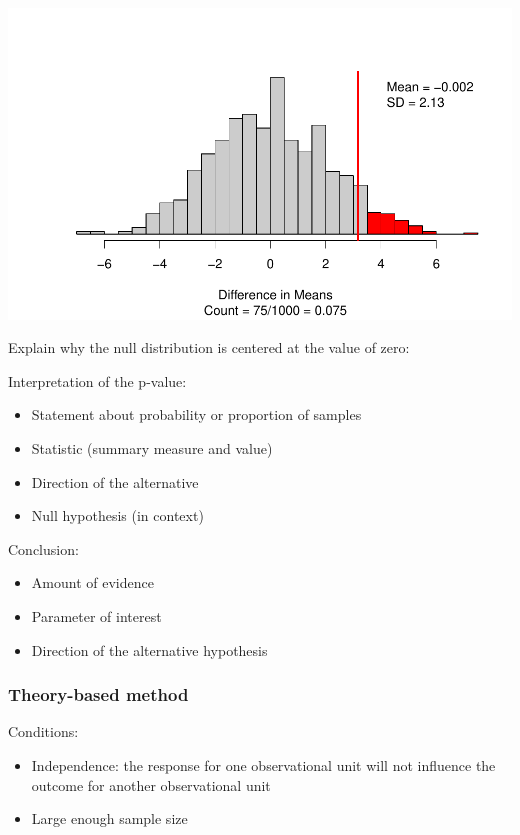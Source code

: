 \documentclass[
]{report}
\begin{document}
\begin{center}\includegraphics[width=0.7\linewidth]{12-LN012-1ofeach_files/figure-latex/unnamed-chunk-3-1} \end{center}

Explain why the null distribution is centered at the value of zero:

\newpage

Interpretation of the p-value:

\begin{itemize}
\item
  Statement about probability or proportion of samples
\item
  Statistic (summary measure and value)
\item
  Direction of the alternative
\item
  Null hypothesis (in context)
\end{itemize}

\vspace{0.8in}

Conclusion:

\begin{itemize}
\item
  Amount of evidence
\item
  Parameter of interest
\item
  Direction of the alternative hypothesis
\end{itemize}

\vspace{0.6in}

\hypertarget{theory-based-method-3}{%
\subsubsection*{Theory-based method}\label{theory-based-method-3}}

Conditions:

\begin{itemize}
\item
  Independence: the response for one observational unit will not influence the outcome for another observational unit
\item
  Large enough sample size
\end{itemize}
\end{document}
